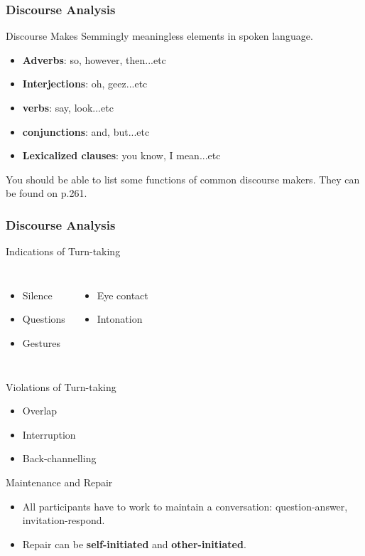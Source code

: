 \documentclass{beamer}
\begin{document}
\begin{frame}
\frametitle{Discourse Analysis}
\begin{block}{Discourse Makes}
Semmingly meaningless elements in spoken language.
\begin{itemize}
\item \textbf{Adverbs}: so, however, then...etc
\item \textbf{Interjections}: oh, geez...etc
\item \textbf{verbs}: say, look...etc
\item \textbf{conjunctions}: and, but...etc
\item \textbf{Lexicalized clauses}: you know, I mean...etc
\end{itemize}
\end{block}
You should be able to list some functions of common discourse makers. They can be found on p.261.
\end{frame}
\begin{frame}
\frametitle{Discourse Analysis}
\begin{block}{Indications of Turn-taking}
\begin{columns}[c] 
\begin{itemize}
\item Silence
\item Questions
\item Gestures
\end{itemize}
\begin{itemize}
\item Eye contact
\item Intonation
\end{itemize}
\end{columns}
\end{block}

\begin{block}{Violations of Turn-taking}
\begin{itemize}
\item Overlap
\item Interruption
\item Back-channelling
\end{itemize}
\end{block}

\begin{block}{Maintenance and Repair}
\begin{itemize}
\item All participants have to work to maintain a conversation: question-answer, invitation-respond.
\item Repair can be \textbf{self-initiated} and \textbf{other-initiated}.
\end{itemize}
\end{block}
\end{frame}
\end{document}

